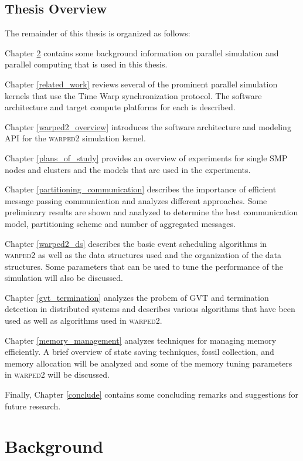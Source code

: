 \documentclass[11pt]{book}
\begin{document}
\section{Thesis Overview}

The remainder of this thesis is organized as follows:

Chapter \ref{background} contains some background information on parallel simulation and
parallel computing that is used in this thesis.

Chapter \ref{related_work} reviews several of the prominent parallel simulation kernels
that use the Time Warp synchronization protocol.  The software architecture and target
compute platforms for each is described.

Chapter \ref{warped2_overview} introduces the software architecture and modeling API for
the \textsc{warped2} simulation kernel.

Chapter \ref{plans_of_study} provides an overview of experiments for single SMP nodes and
clusters and the models that are used in the experiments.

Chapter \ref{partitioning_communication} describes the importance of efficient message
passing communication and analyzes different approaches.  Some preliminary results are
shown and analyzed to determine the best communication model, partitioning scheme and
number of aggregated messages.

Chapter \ref{warped2_ds} describes the basic event scheduling algorithms in
\textsc{warped2} as well as the data structures used and the organization of the data
structures.  Some parameters that can be used to tune the performance of the simulation
will also be discussed.

Chapter \ref{gvt_termination} analyzes the probem of GVT and termination detection in
distributed systems and describes various algorithms that have been used as well as
algorithms used in \textsc{warped2}.

Chapter \ref{memory_management} analyzes techniques for managing memory efficiently.  A
brief overview of state saving techniques, fossil collection, and memory allocation will
be analyzed and some of the memory tuning parameters in \textsc{warped2} will be
discussed.

Finally, Chapter \ref{conclude} contains some concluding remarks and suggestions for
future research.


\chapter{Background}\label{background}
\end{document}
